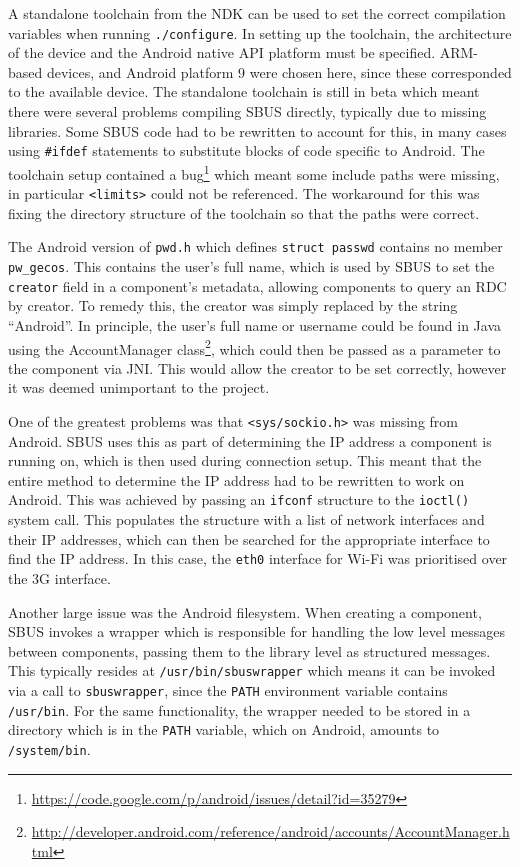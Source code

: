 \documentclass[12pt,twoside,notitlepage]{report}
\begin{document}
A standalone toolchain from the NDK can be used to set the correct compilation variables when running {\tt ./configure}. 
In setting up the toolchain, the architecture of the device and the Android native API platform must be specified. 
ARM-based devices, and Android platform 9 were chosen here, since these corresponded to the available device. 
The standalone toolchain is still in beta which meant there were several problems compiling SBUS directly, typically due to missing libraries. 
Some SBUS code had to be rewritten to account for this, in many cases using {\tt \#ifdef} statements to substitute blocks of code specific to Android. 
The toolchain setup contained a bug\footnote{\url{https://code.google.com/p/android/issues/detail?id=35279}} which meant some include paths were missing, in particular {\tt <limits>} could not be referenced. 
The workaround for this was fixing the directory structure of the toolchain so that the paths were correct. 

The Android version of {\tt pwd.h} which defines {\tt struct passwd} contains no member {\tt pw\_gecos}. 
This contains the user's full name, which is used by SBUS to set the {\tt creator} field in a component's metadata, allowing components to query an RDC by creator. 
To remedy this, the creator was simply replaced by the string ``Android''. 
In principle, the user's full name or username could be found in Java using the AccountManager class\footnote{\url{http://developer.android.com/reference/android/accounts/AccountManager.html}}, which could then be passed as a parameter to the component via JNI. 
This would allow the creator to be set correctly, however it was deemed unimportant to the project. 

One of the greatest problems was that {\tt <sys/sockio.h>} was missing from Android.
SBUS uses this as part of determining the IP address a component is running on, which is then used during connection setup. 
This meant that the entire method to determine the IP address had to be rewritten to work on Android. 
This was achieved by passing an {\tt ifconf} structure to the {\tt ioctl()} system call.
This populates the structure with a list of network interfaces and their IP addresses, which can then be searched for the appropriate interface to find the IP address. 
In this case, the {\tt eth0} interface for Wi-Fi was prioritised over the 3G interface.

Another large issue was the Android filesystem. 
When creating a component, SBUS invokes a wrapper which is responsible for handling the low level messages between components, passing them to the library level as structured messages.
This typically resides at {\tt /usr/bin/sbuswrapper} which means it can be invoked via a call to {\tt sbuswrapper}, since the {\tt PATH} environment variable contains {\tt /usr/bin}. 
For the same functionality, the wrapper needed to be stored in a directory which is in the {\tt PATH} variable, which on Android, amounts to {\tt /system/bin}. 
\end{document}
